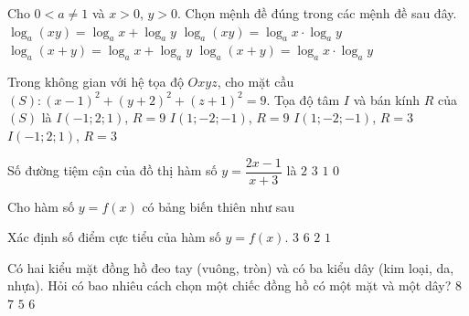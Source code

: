 \begin{ex}%
Cho $0<a\ne 1$ và $x>0$, $y>0$. Chọn mệnh đề đúng trong các mệnh đề sau đây.
\choice
{\True $\log_a (xy)=\log_a x+\log_a y$}
{$\log_a (xy)=\log_a x\cdot \log_a y$}
{$\log_a (x+y)=\log_a x+\log_a y$}
{$\log_a (x+y)=\log_a x\cdot \log_a y$}
\end{ex}

\begin{ex}%
Trong không gian với hệ tọa độ $Oxyz$, cho mặt cầu $(S)\colon (x-1)^2+(y+2)^2+(z+1)^2=9$. Tọa độ tâm $I$ và bán kính $R$ của $(S)$ là
\choice
{$I(-1;2;1)$, $R=9$}
{$I(1;-2;-1)$, $R=9$}
{\True $I(1;-2;-1)$, $R=3$}
{$I(-1;2;1)$, $R=3$}
\end{ex}

\begin{ex}%
Số đường tiệm cận của đồ thị hàm số $y=\dfrac{2x-1}{x+3}$ là
\choice
{\True $2$}
{$3$}
{$1$}
{$0$}
\end{ex}

\begin{ex}%
Cho hàm số $y=f(x)$ có bảng biến thiên như sau
\begin{center}
\end{center}
Xác định số điểm cực tiểu của hàm số $y=f(x)$.
\choice
{$3$}
{$6$}
{\True $2$}
{$1$}
\end{ex}

\begin{ex}%
Có hai kiểu mặt đồng hồ đeo tay (vuông, tròn) và có ba kiểu dây (kim loại, da, nhựa). Hỏi có bao nhiêu cách chọn một chiếc đồng hồ có một mặt và một dây?
\choice
{$8$}
{$7$}
{$5$}
{\True $6$}
\end{ex}

